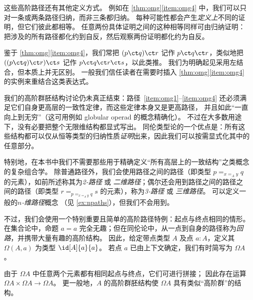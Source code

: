 \begin{rmk}
  这些高阶路径还有其他定义方式。
  例如在 \cref{thm:omg}\ref{item:omg4} 中，我们可以只对一条或两条路径归纳，而非三条都归纳。
  每种可能性都会产生\emph{定义上}不同的证明，但它们彼此都相等。
  任意两份具体证明之间的这种相等同样可由归纳证明：把涉及的所有路径都化约到自反，然后观察两份证明都化约为自反。
\end{rmk}

鉴于 \cref{thm:omg}\ref{item:omg4}，我们常把 $(p\ct q)\ct r$ 记作 $p\ct q\ct r$，类似地把 $((p\ct q)\ct r)\ct s$ 记作 $p\ct q\ct r \ct s$，以此类推。
我们为明确起见采用左结合，但本质上并无区别。
一般我们信任读者在需要时插入 \cref{thm:omg}\ref{item:omg4} 的实例来重结合这类表达式。

我们的高阶群胚结构讨论仍未真正结束：路径~\ref{item:omg1}--\ref{item:omg4} 还必须满足它们自身更高层的一致性定律，而这些定律本身又是更高路径，
%
%
%
%
并且如此“一直向上到无穷”（这可用例如 globular operad 的概念精确化）。
不过在大多数用途下，没有必要把整个无限维结构都显式写出。
同伦类型论的一个优点是：所有这些结构都可以仅从恒等类型的归纳性质\emph{证明}出来，因此我们可以按需显式化其中的任意部分。

特别地，在本书中我们不需要那些用于精确定义“所有高层上的一致结构”之类概念的复杂组合学。
除普通路径外，我们会使用路径之间的路径（即类型 $p =_{x=_A y} q$ 的元素），如前所述称其为\emph{2-路径} 或 \emph{二维路径}；偶尔还会用到路径之间的路径之间的路径（即类型 $r = _{p =_{x=_A y} q} s$ 的元素），称为\emph{3-路径} 或 \emph{三维路径}。
可以定义一般的\emph{$n$-维路径}概念
%
%
%
%
（见 \cref{ex:npaths}），但我们不会用到。

不过，我们会使用一个特别重要且简单的高阶路径特例：起点与终点相同的情形。
在集合论中，命题 $a=a$ 完全无趣；但在同伦论中，从一点到自身的路径称为\emph{回路}，并携带大量有趣的高阶结构。
因此，给定带点类型 $A$ 及点 $a:A$，定义其 
%
$\Omega(A,a)$ 为类型 $\id[A]{a}{a}$。
若点 $a$ 已由上下文确定，我们有时简写为 $\Omega A$。

由于 $\Omega A$ 中任意两个元素都有相同起点与终点，它们可进行拼接；
因此存在运算 $\Omega A\times \Omega A\to \Omega A$。
更一般地，$A$ 的高阶群胚结构使 $\Omega A$ 具有类似“高阶群”的结构。

